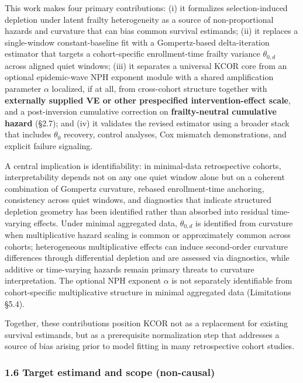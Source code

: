 \documentclass[
]{article}
\begin{document}
This work makes four primary contributions: (i) it formalizes
selection-induced depletion under latent frailty heterogeneity as a
source of non-proportional hazards and curvature that can bias common
survival estimands; (ii) it replaces a single-window constant-baseline
fit with a Gompertz-based delta-iteration estimator that targets a
cohort-specific enrollment-time frailty variance \(\theta_{0,d}\) across
aligned quiet windows; (iii) it separates a universal KCOR core from an
optional epidemic-wave NPH exponent module with a shared amplification
parameter \(\alpha\) localized, if at all, from cross-cohort structure
together with \textbf{externally supplied VE or other prespecified
intervention-effect scale}, and a post-inversion cumulative correction
on \textbf{frailty-neutral cumulative hazard} (§2.7); and (iv) it
validates the revised estimator using a broader stack that includes
\(\theta_0\) recovery, control analyses, Cox mismatch demonstrations,
and explicit failure signaling.

A central implication is identifiability: in minimal-data retrospective
cohorts, interpretability depends not on any one quiet window alone but
on a coherent combination of Gompertz curvature, rebased enrollment-time
anchoring, consistency across quiet windows, and diagnostics that
indicate structured depletion geometry has been identified rather than
absorbed into residual time-varying effects. Under minimal aggregated
data, \(\theta_{0,d}\) is identified from curvature when multiplicative
hazard scaling is common or approximately common across cohorts;
heterogeneous multiplicative effects can induce second-order curvature
differences through differential depletion and are assessed via
diagnostics, while additive or time-varying hazards remain primary
threats to curvature interpretation. The optional NPH exponent
\(\alpha\) is not separately identifiable from cohort-specific
multiplicative structure in minimal aggregated data (Limitations §5.4).

Together, these contributions position KCOR not as a replacement for
existing survival estimands, but as a prerequisite normalization step
that addresses a source of bias arising prior to model fitting in many
retrospective cohort studies.

\subsubsection{1.6 Target estimand and scope
(non-causal)}\label{target-estimand-and-scope-non-causal}
\end{document}
